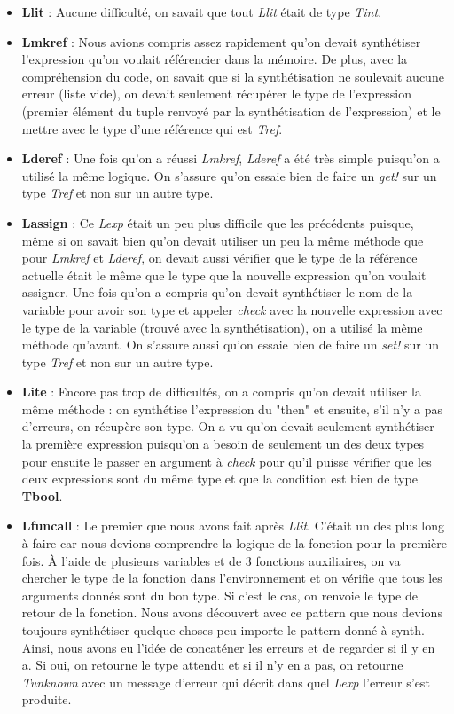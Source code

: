 \documentclass{article}
\begin{document}
\begin{itemize}
    \item \textbf{Llit} : Aucune difficulté, on savait que tout \textit{Llit} était de type \textit{Tint}.
    \item \textbf{Lmkref} : Nous avions compris assez rapidement qu'on devait synthétiser l'expression qu'on voulait référencier dans la mémoire. De plus, avec la compréhension du code, on savait que si la synthétisation ne soulevait aucune erreur (liste vide), on devait seulement récupérer le type de l'expression (premier élément du tuple renvoyé par la synthétisation de l'expression) et le mettre avec le type d'une référence qui est \textit{Tref}. 
    \item \textbf{Lderef} : Une fois qu'on a réussi \textit{Lmkref}, \textit{Lderef} a été très simple puisqu'on a utilisé la même logique. On s'assure qu'on essaie bien de faire un \textit{get!} sur un type \textit{Tref} et non sur un autre type.
    \item \textbf{Lassign} : Ce \textit{Lexp} était un peu plus difficile que les précédents puisque, même si on savait bien qu'on devait utiliser un peu la même méthode que pour \textit{Lmkref} et \textit{Lderef}, on devait aussi vérifier que le type de la référence actuelle était le même que le type que la nouvelle expression qu'on voulait assigner. Une fois qu'on a compris qu'on devait synthétiser le nom de la variable pour avoir son type et appeler \textit{check} avec la nouvelle expression avec le type de la variable (trouvé avec la synthétisation), on a utilisé la même méthode qu'avant. On s'assure aussi qu'on essaie bien de faire un \textit{set!} sur un type \textit{Tref} et non sur un autre type.
    \item \textbf{Lite} : Encore pas trop de difficultés, on a compris qu'on devait utiliser la même méthode : on synthétise l'expression du "then" et ensuite, s'il n'y a pas d'erreurs, on récupère son type. On a vu qu'on devait seulement synthétiser la première expression puisqu'on a besoin de seulement un des deux types pour ensuite le passer en argument à \textit{check} pour qu'il puisse vérifier que les deux expressions sont du même type et que la condition est bien de type \textbf{Tbool}.
    \item \textbf{Lfuncall} : Le premier que nous avons fait après \textit{Llit}. C'était un des plus long à faire car nous devions comprendre la logique de la fonction pour la première fois. À l'aide de plusieurs variables et de 3 fonctions auxiliaires, on va chercher le type de la fonction dans l'environnement et on vérifie que tous les arguments donnés sont du bon type. Si c'est le cas, on renvoie le type de retour de la fonction. Nous avons découvert avec ce pattern que nous devions toujours synthétiser quelque choses peu importe le pattern donné à synth. Ainsi, nous avons eu l'idée de concaténer les erreurs et de regarder si il y en a. Si oui, on retourne le type attendu et si il n'y en a pas, on retourne \textit{Tunknown} avec un message d'erreur qui décrit dans quel \textit{Lexp} l'erreur s'est produite.

\end{itemize}
\end{document}
